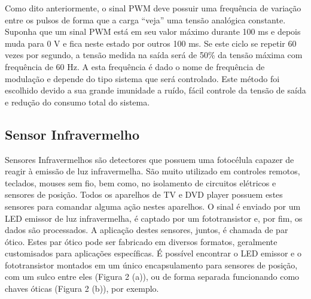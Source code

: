 Como dito anteriormente, o sinal PWM deve possuir uma frequência de variação entre os pulsos de forma que a carga “veja” uma tensão analógica constante. Suponha que um sinal PWM está em seu valor máximo durante 100 ms e depois muda para 0 V e fica neste estado por outros 100 ms. Se este ciclo se repetir 60 vezes por segundo, a tensão medida na saída será de 50\% da tensão máxima com frequência de 60 Hz. A esta frequência é dado o nome de frequência de modulação e depende do tipo sistema que será controlado.
Este método foi escolhido devido a sua grande imunidade a ruído, fácil controle da tensão de saída e redução do consumo total do sistema.

\subsection{Sensor Infravermelho} %
\label{sub:sensor_infra}

Sensores Infravermelhos são detectores que possuem uma fotocélula capazer de reagir à emissão de luz infravermelha. São muito utilizado em controles remotos, teclados, mouses sem fio, bem como, no isolamento de circuitos elétricos e sensores de posição. Todos os aparelhos de TV e DVD player possuem estes sensores para comandar alguma ação nestes aparelhos. O sinal é enviado por um LED emissor de luz infravermelha, é captado por um fototransistor e, por fim, os dados são processados. 
A aplicação destes sensores, juntos, é chamada de par ótico. Estes par ótico pode ser fabricado em diversos formatos, geralmente customisados para aplicações específicas. É possível encontrar o LED emissor e o fototransistor montados em um único encapsulamento para sensores de posição, com um sulco entre eles (Figura 2 (a)), ou de forma separada funcionando como chaves óticas (Figura 2 (b)), por exemplo.
